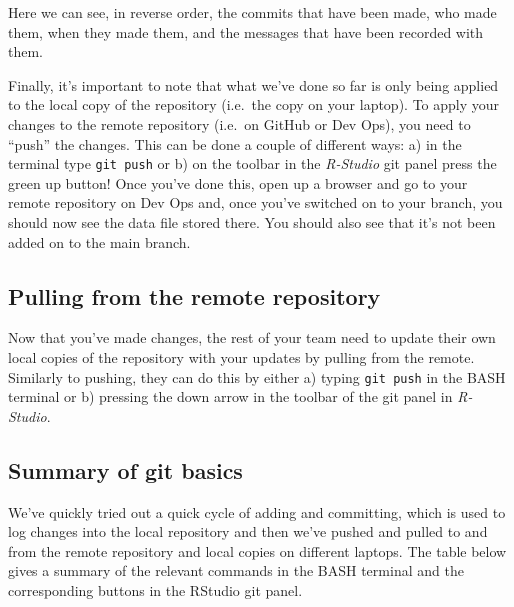 \documentclass[
  12pt,
]{article}
\begin{document}
Here we can see, in reverse order, the commits that have been made, who
made them, when they made them, and the messages that have been recorded
with them.

Finally, it's important to note that what we've done so far is only
being applied to the local copy of the repository (i.e.~the copy on your
laptop). To apply your changes to the remote repository (i.e.~on GitHub
or Dev Ops), you need to ``push'' the changes. This can be done a couple
of different ways: a) in the terminal type \texttt{git\ push} or b) on
the toolbar in the \emph{R-Studio} git panel press the green up button!
Once you've done this, open up a browser and go to your remote
repository on Dev Ops and, once you've switched on to your branch, you
should now see the data file stored there. You should also see that it's
not been added on to the main branch.

\hypertarget{pulling-from-the-remote-repository}{%
\subsection{Pulling from the remote
repository}\label{pulling-from-the-remote-repository}}

Now that you've made changes, the rest of your team need to update their
own local copies of the repository with your updates by pulling from the
remote. Similarly to pushing, they can do this by either a) typing
\texttt{git\ push} in the BASH terminal or b) pressing the down arrow in
the toolbar of the git panel in \emph{R-Studio}.

\hypertarget{summary-of-git-basics}{%
\subsection{Summary of git basics}\label{summary-of-git-basics}}

We've quickly tried out a quick cycle of adding and committing, which is
used to log changes into the local repository and then we've pushed and
pulled to and from the remote repository and local copies on different
laptops. The table below gives a summary of the relevant commands in the
BASH terminal and the corresponding buttons in the RStudio git panel.
\end{document}
